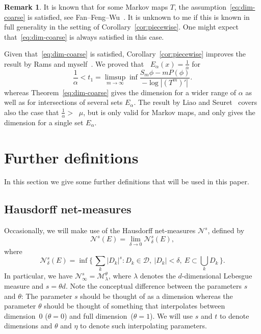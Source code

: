 \documentclass[10pt]{amsart}
\theoremstyle{definition}\newtheorem{defi}[theo]{Definition}\newtheorem{rema}[theo]{Remark}\newtheorem{exam}[theo]{Example}\newtheorem{exem}[theo]{Example}\newtheorem{nota}[theo]{Notation}
\DeclareMathOperator{\dimh}{dim_H}
\begin{document}
\begin{rema}
It is known that for some Markov maps $T$, the assumption~\eqref{eq:dim-coarse} is satisfied, see Fan--Feng--Wu~\cite{fanfengwu}. It is unknown to me if this is known in full generality in the setting of Corollary~\ref{cor:piecewise}. One might expect that~\eqref{eq:dim-coarse} is always satisfied in this case.

Given that~\eqref{eq:dim-coarse} is satisfied, Corollary~\ref{cor:piecewise} improves the result by Rams and myself~\cite[Theorem~2]{perssonrams}. We proved that $\dimh E_\alpha (x) =
\frac{1}{\alpha}$ for
\[
\frac{1}{\alpha} < t_1 = \limsup_{m\to \infty} \inf \frac{S_m \phi - m P(\phi)}{- \log |(T^m)'|}.
\]
whereas Theorem~\ref{eq:dim-coarse} gives the dimension for a wider range of $\alpha$ as well as for intersections of several sets $E_\alpha$. The result by Liao and Seuret~\cite{liaoseuret} covers also the case that $\frac{1}{\alpha} > \dimh \mu$, but is only valid for Markov maps, and only gives the dimension for a single set $E_\alpha$.
\end{rema}



\section{Further definitions} \label{sec:furtherdefinitions}

In this section we give some further definitions that will be used in this paper.

\subsection{Hausdorff net-measures}

Occasionally, we will make use of the Hausdorff net-measures $\mathscr{N}^s$, defined by
\[
\mathscr{N}^s (E) = \lim_{\delta \to 0} \mathscr{N}_\delta^s (E),
\]
where
\[
\mathscr{N}_\delta^s (E) = \inf \biggl\{\, \sum_k |D_k|^s : D_k
\in \mathscr{D}, \ |D_k| < \delta,\ E \subset \bigcup_k D_k
\,\biggr\}.
\]
In particular, we have $\mathscr{N}_\infty^s =
\mathscr{M}_\lambda^{\theta}$, where $\lambda$ denotes the $d$-dimensional Lebesgue measure and $s = \theta d$. Note the conceptual difference between the parameters $s$ and $\theta$: The parameter $s$ should be thought of as a dimension whereas the parameter $\theta$ should be thought of something that interpolates between dimension~0 ($\theta = 0$) and full dimension~($\theta = 1$). We will use $s$ and $t$ to denote dimensions and $\theta$ and $\eta$ to denote such interpolating parameters.
\end{document}
